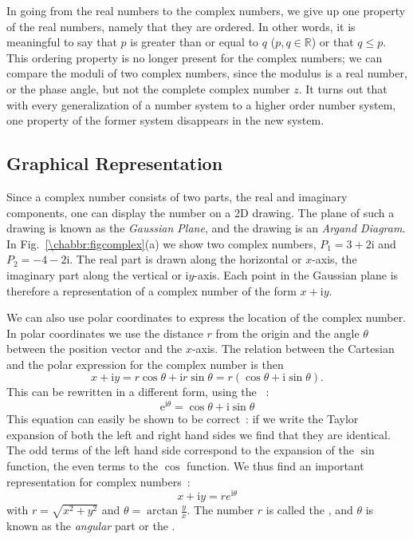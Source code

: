 In going from the real numbers to the complex numbers, we give up one property of the real numbers, namely that they are ordered.  In other words, it is meaningful to say that $p$ is greater than or equal to $q$ ($p,q\in\mathbb{R}$) or that $q\le p$. This ordering  property is no longer present for the complex numbers; we can compare the moduli of two complex numbers, since the modulus is a real number, or the phase angle, but  not the complete complex number $z$. It turns out that with every generalization of a number system to a higher order number system, one property of the former system disappears in the new system.




\subsection{Graphical Representation}

Since a complex number consists of two parts, the real and imaginary components, one can display the number on a 2D drawing.
The plane of such a drawing is known as the \textit{Gaussian Plane}, and the drawing is an \textit{Argand Diagram}.
In Fig.~\ref{\chabbr:figcomplex}(a) we show two complex numbers, $P_1=3+2\mathrm{i}$ and $P_2=-4-2\mathrm{i}$.  The real part is drawn along the 
horizontal or $x$-axis, the imaginary part along the vertical or $\mathrm{i}y$-axis.  Each point in the Gaussian plane is therefore a representation of a complex number of the form $x+\mathrm{i}y$.

We can also use polar coordinates to express the location of the complex number.  In polar coordinates
we use the distance $r$ from the origin and the angle $\theta$ between the position vector and the $x$-axis.
The relation between the Cartesian and the polar expression for the complex number is then
\begin{equation}
x+\mathrm{i}y=r\cos\theta+\mathrm{i}r\sin\theta=r(\cos\theta+\mathrm{i}\sin\theta).
\end{equation}
This can be rewritten in a different form, using the ~:
\begin{equation}
	\mathrm{e}^{\mathrm{i}\theta}=\cos\theta+\mathrm{i}\sin\theta
\end{equation}
This equation can easily be shown to be correct~:  if we write the Taylor expansion of both the left and right hand sides
we find that they are identical.  The odd terms of the left hand side correspond to the expansion of the $\sin$ function, the
even terms to the $\cos$ function.  We thus find an important representation for complex numbers~:
\begin{equation}
	x+\mathrm{i}y=re^{\mathrm{i}\theta}
\end{equation}
with $r=\sqrt{x^2+y^2}$ and $\theta=\arctan\frac{y}{x}$.  The number $r$ is called the , and $\theta$ is known as the \textit{angular} part or the .

